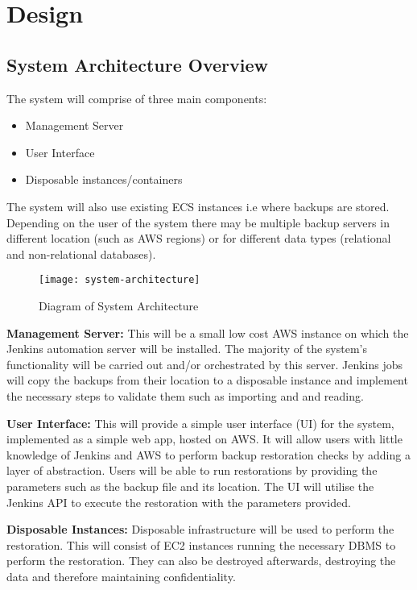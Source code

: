 \section{Design}
	\subsection{System Architecture Overview}
		The system will comprise of three main components:
		\begin{itemize}
			\item Management Server
			\item User Interface
			\item Disposable instances/containers
		\end{itemize}
		The system will also use existing ECS instances i.e  where backups are stored. Depending on the user of the system there may be multiple backup servers in different location (such as AWS regions) or for different data types (relational and non-relational databases).
		
		\begin{figure}[H]
			\setlength{\belowcaptionskip}{15pt plus 3pt minus 2pt}
			\caption{Diagram of System Architecture}
			\centering
			\texttt{[image: system-architecture]}
			\label{fig:diagram}
		\end{figure}
		
		\noindent \textbf{Management Server:} This will be a small low cost AWS instance on which the Jenkins automation server will be installed. The majority of the system's functionality will be carried out and/or orchestrated by this server. Jenkins jobs will copy the backups from their location to a disposable instance and implement the necessary steps to validate them such as importing and and reading.
		
		\noindent \textbf{User Interface:} This will provide a simple user interface (UI) for the system, implemented as a simple web app, hosted on AWS. It will allow users with little knowledge of Jenkins and AWS to perform backup restoration checks by adding a layer of abstraction. Users will be able to run restorations by providing the parameters such as the backup file and its location. The UI will utilise the Jenkins API to execute the restoration with the parameters provided.
		
		\noindent\textbf{Disposable Instances:} Disposable infrastructure will be used to perform the restoration. This will consist of EC2 instances running the necessary DBMS to perform the restoration. They can also be destroyed afterwards, destroying the data and therefore maintaining confidentiality.

